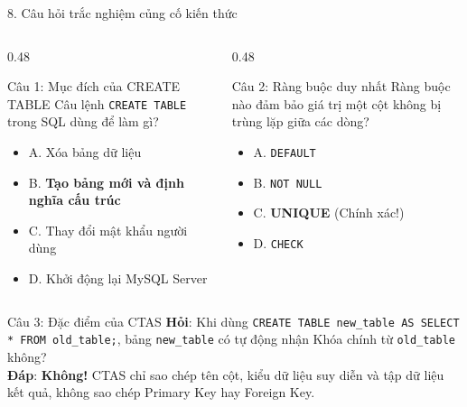\documentclass[aspectratio=169,11pt]{beamer}
\newcommand{\kw}[1]{\textcolor{dbblue}{\textbf{#1}}}
\newcommand{\smallgap}{\vspace{0.2em}}
\begin{document}
\begin{frame}{8. Câu hỏi trắc nghiệm củng cố kiến thức}
\begin{columns}[t]
  \begin{column}{0.48\textwidth}
    \begin{block}{Câu 1: Mục đích của CREATE TABLE}
      Câu lệnh \texttt{CREATE TABLE} trong SQL dùng để làm gì?
      \begin{itemize}
        \item A. Xóa bảng dữ liệu
        \item B. \textbf{\kw{Tạo bảng mới và định nghĩa cấu trúc}}
        \item C. Thay đổi mật khẩu người dùng
        \item D. Khởi động lại MySQL Server
      \end{itemize}
    \end{block}
  \end{column}
  \begin{column}{0.48\textwidth}
    \begin{block}{Câu 2: Ràng buộc duy nhất}
      Ràng buộc nào đảm bảo giá trị một cột không bị trùng lặp giữa các dòng?
      \begin{itemize}
        \item A. \texttt{DEFAULT}
        \item B. \texttt{NOT NULL}
        \item C. \textbf{\kw{UNIQUE}} (Chính xác!)
        \item D. \texttt{CHECK}
      \end{itemize}
    \end{block}
  \end{column}
\end{columns}
\smallgap
\begin{exampleblock}{Câu 3: Đặc điểm của CTAS}
  \textbf{Hỏi}: Khi dùng \texttt{CREATE TABLE new\_table AS SELECT * FROM old\_table;}, bảng \texttt{new\_table} có tự động nhận Khóa chính từ \texttt{old\_table} không?\\
  \textbf{Đáp}: \kw{Không!} CTAS chỉ sao chép tên cột, kiểu dữ liệu suy diễn và tập dữ liệu kết quả, không sao chép Primary Key hay Foreign Key.
\end{exampleblock}
\end{frame}
\end{document}
